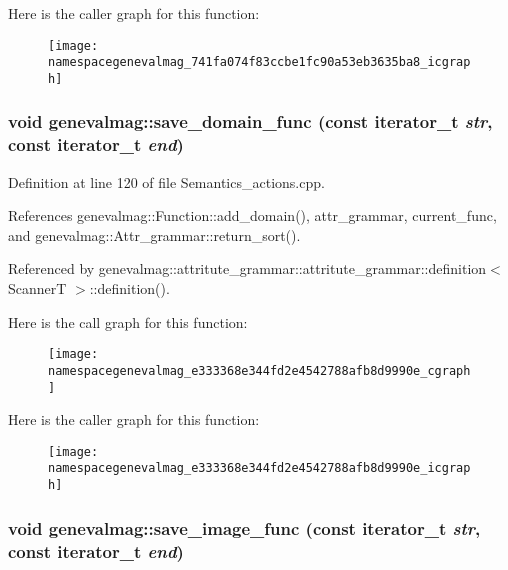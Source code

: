 Here is the caller graph for this function:\nopagebreak
\begin{figure}[H]
\begin{center}
\leavevmode
\texttt{[image: namespacegenevalmag\_741fa074f83ccbe1fc90a53eb3635ba8\_icgraph]}
\end{center}
\end{figure}
\hypertarget{namespacegenevalmag_e333368e344fd2e4542788afb8d9990e}{
\subsubsection[{save\_\-domain\_\-func}]{\setlength{\rightskip}{0pt plus 5cm}void genevalmag::save\_\-domain\_\-func (const iterator\_\-t {\em str}, \/  const iterator\_\-t {\em end})}}
\label{namespacegenevalmag_e333368e344fd2e4542788afb8d9990e}




Definition at line 120 of file Semantics\_\-actions.cpp.

References genevalmag::Function::add\_\-domain(), attr\_\-grammar, current\_\-func, and genevalmag::Attr\_\-grammar::return\_\-sort().

Referenced by genevalmag::attritute\_\-grammar::attritute\_\-grammar::definition$<$ ScannerT $>$::definition().

Here is the call graph for this function:\nopagebreak
\begin{figure}[H]
\begin{center}
\leavevmode
\texttt{[image: namespacegenevalmag\_e333368e344fd2e4542788afb8d9990e\_cgraph]}
\end{center}
\end{figure}


Here is the caller graph for this function:\nopagebreak
\begin{figure}[H]
\begin{center}
\leavevmode
\texttt{[image: namespacegenevalmag\_e333368e344fd2e4542788afb8d9990e\_icgraph]}
\end{center}
\end{figure}
\hypertarget{namespacegenevalmag_6c5fe5628b5ac4b3e2d9c4fc93985abe}{
\subsubsection[{save\_\-image\_\-func}]{\setlength{\rightskip}{0pt plus 5cm}void genevalmag::save\_\-image\_\-func (const iterator\_\-t {\em str}, \/  const iterator\_\-t {\em end})}}
\label{namespacegenevalmag_6c5fe5628b5ac4b3e2d9c4fc93985abe}




